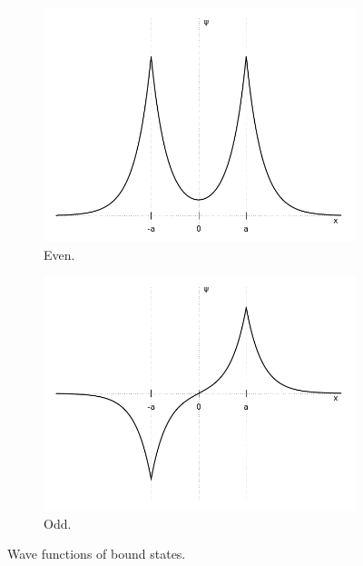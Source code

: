 \documentclass[a4paper,12pt]{article}
\begin{document}
\begin{figure}
  \centering
  \begin{subfigure}[h]{0.48\textwidth}
    \includegraphics[width=\textwidth]{even.png}
    \caption{Even.}
  \end{subfigure}
  \begin{subfigure}[h]{0.48\textwidth}
    \includegraphics[width=\textwidth]{odd.png}
    \caption{Odd.}
  \end{subfigure}
  \caption{Wave functions of bound states.}
\end{figure}
\end{document}
